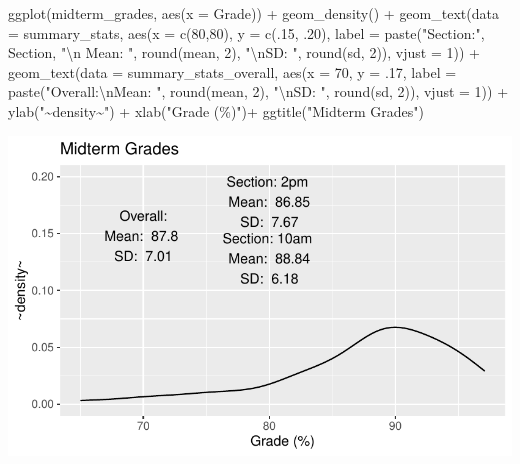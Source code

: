 \documentclass[
  letterpaper,
  DIV=11,
  numbers=noendperiod]{scrartcl}
\newenvironment{Shaded}{\begin{snugshade}}{\end{snugshade}}
\newcommand{\AttributeTok}[1]{\textcolor[rgb]{0.40,0.45,0.13}{#1}}
\newcommand{\DecValTok}[1]{\textcolor[rgb]{0.68,0.00,0.00}{#1}}
\newcommand{\FunctionTok}[1]{\textcolor[rgb]{0.28,0.35,0.67}{#1}}
\newcommand{\NormalTok}[1]{\textcolor[rgb]{0.00,0.23,0.31}{#1}}
\newcommand{\SpecialCharTok}[1]{\textcolor[rgb]{0.37,0.37,0.37}{#1}}
\newcommand{\StringTok}[1]{\textcolor[rgb]{0.13,0.47,0.30}{#1}}
\begin{document}
\begin{Shaded}
\begin{Highlighting}[]
\FunctionTok{ggplot}\NormalTok{(midterm\_grades, }\FunctionTok{aes}\NormalTok{(}\AttributeTok{x =}\NormalTok{ Grade)) }\SpecialCharTok{+} \FunctionTok{geom\_density}\NormalTok{() }\SpecialCharTok{+} 
  \FunctionTok{geom\_text}\NormalTok{(}\AttributeTok{data =}\NormalTok{ summary\_stats, }\FunctionTok{aes}\NormalTok{(}\AttributeTok{x =} \FunctionTok{c}\NormalTok{(}\DecValTok{80}\NormalTok{,}\DecValTok{80}\NormalTok{), }\AttributeTok{y =} \FunctionTok{c}\NormalTok{(.}\DecValTok{15}\NormalTok{, .}\DecValTok{20}\NormalTok{), }\AttributeTok{label =} \FunctionTok{paste}\NormalTok{(}\StringTok{"Section:"}\NormalTok{, Section, }\StringTok{"}\SpecialCharTok{\textbackslash{}n}\StringTok{ Mean: "}\NormalTok{, }\FunctionTok{round}\NormalTok{(mean, }\DecValTok{2}\NormalTok{), }\StringTok{"}\SpecialCharTok{\textbackslash{}n}\StringTok{SD: "}\NormalTok{, }\FunctionTok{round}\NormalTok{(sd, }\DecValTok{2}\NormalTok{)), }\AttributeTok{vjust =} \DecValTok{1}\NormalTok{)) }\SpecialCharTok{+}
  \FunctionTok{geom\_text}\NormalTok{(}\AttributeTok{data =}\NormalTok{ summary\_stats\_overall, }\FunctionTok{aes}\NormalTok{(}\AttributeTok{x =} \DecValTok{70}\NormalTok{, }\AttributeTok{y =}\NormalTok{ .}\DecValTok{17}\NormalTok{, }\AttributeTok{label =} \FunctionTok{paste}\NormalTok{(}\StringTok{"Overall:}\SpecialCharTok{\textbackslash{}n}\StringTok{Mean: "}\NormalTok{, }\FunctionTok{round}\NormalTok{(mean, }\DecValTok{2}\NormalTok{), }\StringTok{"}\SpecialCharTok{\textbackslash{}n}\StringTok{SD: "}\NormalTok{, }\FunctionTok{round}\NormalTok{(sd, }\DecValTok{2}\NormalTok{)), }\AttributeTok{vjust =} \DecValTok{1}\NormalTok{)) }\SpecialCharTok{+}
  \FunctionTok{ylab}\NormalTok{(}\StringTok{"\textasciitilde{}density\textasciitilde{}"}\NormalTok{) }\SpecialCharTok{+} \FunctionTok{xlab}\NormalTok{(}\StringTok{"Grade (\%)"}\NormalTok{)}\SpecialCharTok{+} \FunctionTok{ggtitle}\NormalTok{(}\StringTok{"Midterm Grades"}\NormalTok{)}
\end{Highlighting}
\end{Shaded}

\includegraphics{Lecture12_files/figure-pdf/unnamed-chunk-1-1.pdf}
\end{document}
